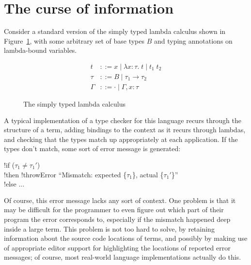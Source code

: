 \documentclass[sigplan, screen]{acmart}\settopmatter{printccs=false,printacmref=false}
\begin{document}
\section{The curse of information}

Consider a standard version of the simply typed lambda calculus shown
in Figure~\ref{fig:STLC}, with
some arbitrary set of base types $B$ and typing annotations on
lambda-bound variables.

\newcommand{\lam}[3]{\lambda {#1}\!:\!{#2}.\; {#3}}
\newcommand{\app}[2]{{#1}\; {#2}}

\newcommand{\ty}[3]{{#1} \vdash {#2} : {#3}}
\newcommand{\nty}[3]{{#1} \nvdash {#2} : {#3}}

\begin{figure}[h!]
\begin{align*}
  t &::= x \mid \lam x \tau t \mid \app{t_1}{t_2} \\
  \tau &::= B \mid \tau_1 \to \tau_2 \\
  \Gamma &::= \cdot \mid \Gamma,x:\tau
\end{align*}

\caption{The simply typed lambda calculus} \label{fig:STLC}
\end{figure}

A typical implementation of a type checker for this language recurs
through the structure of a term, adding bindings to the context as it
recurs through lambdas, and checking that the types match up
appropriately at each application.  If the types don't match, some
sort of error message is generated: \medskip

\begin{acode}
  \> !if ($\tau_1 \neq \tau_1'$) \\
  \> \tb \> !then \> !throwError ``Mismatch: expected \{$\tau_1$\}, actual \{$\tau_1'$\}'' \\
  \> !else \> ...
\end{acode} \medskip

Of course, this error message lacks any sort of context.  One problem
is that it may be difficult for the programmer to even figure out
which part of their program the error corresponds to, especially if
the mismatch happened deep inside a large term. This problem is not
too hard to solve, by retaining information about the source code
locations of terms, and possibly by making use of appropriate editor
support for highlighting the locations of reported error messages; of
course, most real-world language implementations actually do this.
\end{document}
